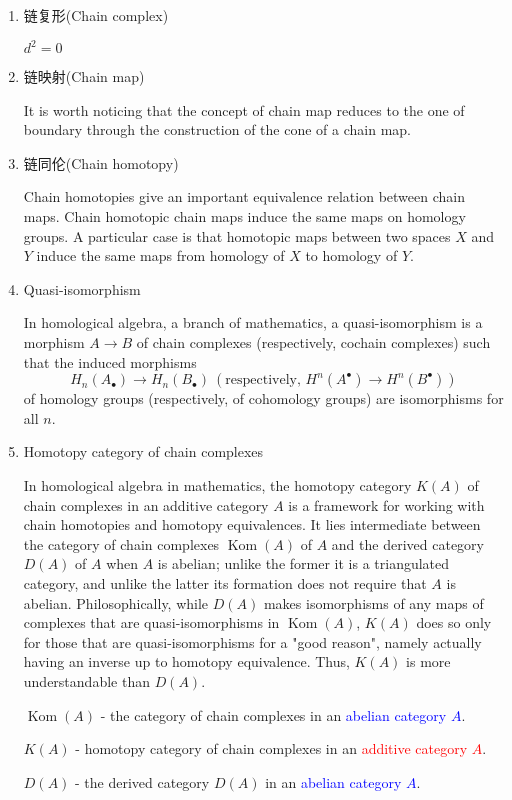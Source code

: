 \documentclass{ctexart}
\DeclareMathOperator{\Kom}{Kom}
\begin{document}
\begin{enumerate}
\item 链复形(Chain complex)

$d^2 = 0$
\item 链映射(Chain map)

It is worth noticing that the concept of chain map reduces to the one of boundary through the construction of the cone of a chain map.

\item 链同伦(Chain homotopy)

Chain homotopies give an important equivalence relation between chain maps. Chain homotopic chain maps induce the same maps on homology groups. A particular case is that homotopic maps between two spaces $X$ and $Y$ induce the same maps from homology of $X$ to homology of $Y$.

\item Quasi-isomorphism

In homological algebra, a branch of mathematics, a quasi-isomorphism is a morphism $A\to B$ of chain complexes (respectively, cochain complexes) such that the induced morphisms
\[
H_n(A_\bullet) \to H_n(B_\bullet)\ (\text{respectively, } H^n(A^\bullet) \to H^n(B^\bullet))
\]
of homology groups (respectively, of cohomology groups) are isomorphisms for all $n$.

\item Homotopy category of chain complexes

In homological algebra in mathematics, the homotopy category $K(A)$ of chain complexes in an additive category $A$ is a framework for working with chain homotopies and homotopy equivalences. It lies intermediate between the category of chain complexes $\Kom(A)$ of $A$ and the derived category $D(A)$ of $A$ when $A$ is abelian; unlike the former it is a triangulated category, and unlike the latter its formation does not require that $A$ is abelian. Philosophically, while $D(A)$ makes isomorphisms of any maps of complexes that are quasi-isomorphisms in $\Kom(A)$, $K(A)$ does so only for those that are quasi-isomorphisms for a "good reason", namely actually having an inverse up to homotopy equivalence. Thus, $K(A)$ is more understandable than $D(A)$.

$\Kom(A)$ - the category of chain complexes in an \textcolor{blue}{abelian category $A$}.

$K(A)$ - homotopy category of chain complexes in an \textcolor{red}{additive category $A$}.

$D(A)$ - the derived category $D(A)$ in an \textcolor{blue}{abelian category $A$}.


\end{enumerate}
\end{document}
